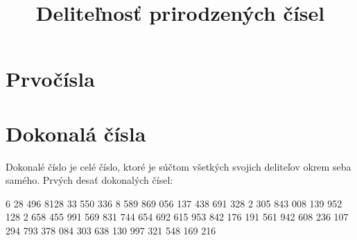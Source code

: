 \documentclass{article}
\title{Deliteľnosť prirodzených čísel}
\begin{document}
\maketitle

\section{Prvočísla}

\section{Dokonalá čísla}

Dokonalé číslo je celé číslo, ktoré je súčtom všetkých svojich deliteľov okrem seba samého.
Prvých desať dokonalých čísel:

6
28
496
8128
33 550 336
8 589 869 056
137 438 691 328
2 305 843 008 139 952 128
2 658 455 991 569 831 744 654 692 615 953 842 176
191 561 942 608 236 107 294 793 378 084 303 638 130 997 321 548 169 216
\end{document}
